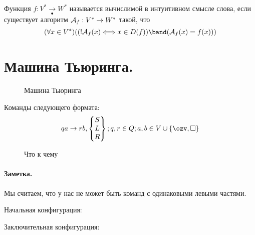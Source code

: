 \begin{definition}
Функция $f: V^{*} \underset{\bullet}{\to } W^{*}$ называется вычислимой в интуитивном смысле слова,
если существует алгоритм $ {\cal A}_f: V^{*} \to  W^{*}$ такой, что
$$(\forall x \in V^{*})
((! {\cal A}_f(x) \Longleftrightarrow x \in D(f))\band ( {\cal A}_f (x) = f(x)))$$
\end{definition}

\section{Машина Тьюринга.}

\begin{figure}[h]
    \centering
    \caption{Машина Тьюринга}
    \label{turing1}
\end{figure}


Команды следующего формата: \[
qa \to rb,
\begin{Bmatrix}
	S \\ L \\ R
\end{Bmatrix}; q,r \in Q; a,b \in V \cup \{\ozv, \square  \} 
\] 

\begin{figure}[h]
    \centering
    \caption{Что к чему}
    \label{}
\end{figure}

\paragraph*{Заметка.}
Мы считаем, что у нас не может быть команд с одинаковыми левыми частями.

\medskip

\newpage

Начальная конфигурация:

\begin{figure}[h]
    \centering
\end{figure}

Заключительная конфигурация:

\begin{figure}[h]
    \centering
\end{figure}

\medskip

